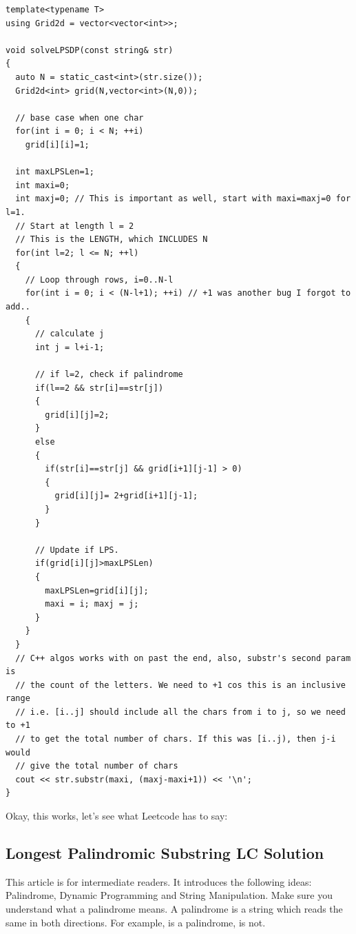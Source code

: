 \begin{lstlisting}[style=raycppnewsnippet]
template<typename T>
using Grid2d = vector<vector<int>>;

void solveLPSDP(const string& str)
{
  auto N = static_cast<int>(str.size());
  Grid2d<int> grid(N,vector<int>(N,0));

  // base case when one char
  for(int i = 0; i < N; ++i)
    grid[i][i]=1;

  int maxLPSLen=1;
  int maxi=0;
  int maxj=0; // This is important as well, start with maxi=maxj=0 for l=1.
  // Start at length l = 2
  // This is the LENGTH, which INCLUDES N
  for(int l=2; l <= N; ++l)
  {
    // Loop through rows, i=0..N-l
    for(int i = 0; i < (N-l+1); ++i) // +1 was another bug I forgot to add..
    {
      // calculate j
      int j = l+i-1;

      // if l=2, check if palindrome
      if(l==2 && str[i]==str[j])
      {
        grid[i][j]=2;
      }
      else
      {
        if(str[i]==str[j] && grid[i+1][j-1] > 0)
        {
          grid[i][j]= 2+grid[i+1][j-1];
        }
      }

      // Update if LPS.
      if(grid[i][j]>maxLPSLen)
      {
        maxLPSLen=grid[i][j];
        maxi = i; maxj = j;
      }
    }
  }
  // C++ algos works with on past the end, also, substr's second param is
  // the count of the letters. We need to +1 cos this is an inclusive range
  // i.e. [i..j] should include all the chars from i to j, so we need to +1
  // to get the total number of chars. If this was [i..j), then j-i would
  // give the total number of chars
  cout << str.substr(maxi, (maxj-maxi+1)) << '\n';
}
\end{lstlisting}
Okay, this works, let's see what Leetcode has to say:

\subsection{Longest Palindromic Substring LC Solution}

This article is for intermediate readers. It introduces the following ideas:
Palindrome, Dynamic Programming and String Manipulation. Make sure you
understand what a palindrome means. A palindrome is a string which reads the
same in both directions. For example,  is a palindrome,
 is not.


